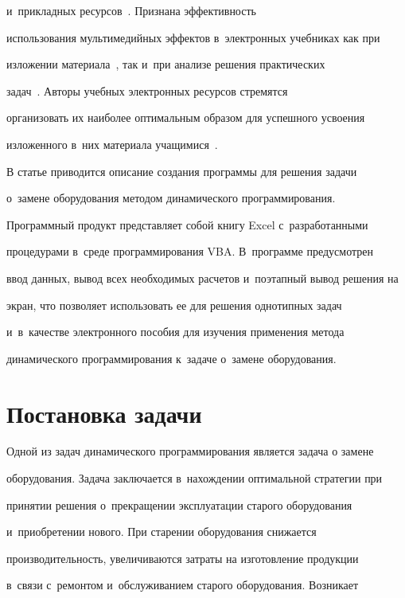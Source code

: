 и~прикладных ресурсов~\cite{3-a, 4-a}. Признана эффективность 


использования мультимедийных эффектов в~электронных учебниках как при 


изложении материала~\cite{5-a}, так и~при анализе решения практических 


задач~\cite{6-a}. Авторы учебных электронных ресурсов стремятся 


организовать их наиболее оптимальным образом для успешного усвоения 


изложенного в~них материала учащимися~\cite{7-a}.


  


  В статье приводится описание создания программы для решения задачи 


о~замене оборудования методом динамического программирования. 


Программный продукт представляет собой книгу Excel с~разработанными 


процедурами в~среде программирования VBA. В~программе предусмотрен 


ввод данных, вывод всех необходимых расчетов и~поэтапный вывод решения на 


экран, что позволяет использовать ее для решения однотипных задач 


и~в~качестве электронного пособия для изучения применения метода 


динамического программирования к~задаче о~замене оборудования.


  


\section{Постановка задачи}





  Одной из задач динамического программирования является задача о замене 


оборудования. Задача заключается в~на\-хож\-де\-нии оптимальной стратегии при 


принятии решения о~прекращении эксплуатации старого оборудования 


и~приобретении нового. При старении оборудования снижается 


производительность, увеличиваются затраты на изготовление продукции 


в~связи с~ремонтом и~обслуживанием старого оборудования. Возникает 


